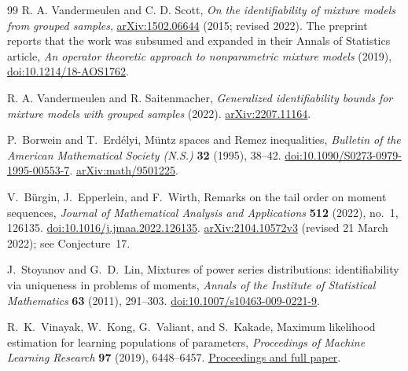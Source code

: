 \documentclass[11pt,letterpaper]{article}
\theoremstyle{definition}
\theoremstyle{remark}
\newcommand{\1}{\mathbf 1}
\begin{document}
\begin{thebibliography}{99}
R. A. Vandermeulen and C. D. Scott,
\emph{On the identifiability of mixture models from grouped samples},
\href{https://arxiv.org/abs/1502.06644}{arXiv:1502.06644}
(2015; revised 2022). The preprint reports that the work was subsumed
and expanded in their Annals of Statistics article,
\emph{An operator theoretic approach to nonparametric mixture models}
(2019), \href{https://doi.org/10.1214/18-AOS1762}{doi:10.1214/18-AOS1762}.


R. A. Vandermeulen and R. Saitenmacher,
\emph{Generalized identifiability bounds for mixture models with grouped
samples} (2022).
\href{https://arxiv.org/abs/2207.11164}{arXiv:2207.11164}.


P.~Borwein and T.~Erd\'elyi,
M\"untz spaces and Remez inequalities,
\emph{Bulletin of the American Mathematical Society (N.S.)}
\textbf{32} (1995), 38--42.
\href{https://doi.org/10.1090/S0273-0979-1995-00553-7}{doi:10.1090/S0273-0979-1995-00553-7}.
\href{https://arxiv.org/abs/math/9501225}{arXiv:math/9501225}.


V.~B\"urgin, J.~Epperlein, and F.~Wirth,
Remarks on the tail order on moment sequences,
\emph{Journal of Mathematical Analysis and Applications}
\textbf{512} (2022), no.~1, 126135.
\href{https://doi.org/10.1016/j.jmaa.2022.126135}{doi:10.1016/j.jmaa.2022.126135}.
\href{https://arxiv.org/abs/2104.10572v3}{arXiv:2104.10572v3}
(revised 21 March 2022); see Conjecture~17.


J.~Stoyanov and G.~D.~Lin,
Mixtures of power series distributions: identifiability via uniqueness
in problems of moments,
\emph{Annals of the Institute of Statistical Mathematics}
\textbf{63} (2011), 291--303.
\href{https://doi.org/10.1007/s10463-009-0221-9}{doi:10.1007/s10463-009-0221-9}.


R.~K.~Vinayak, W.~Kong, G.~Valiant, and S.~Kakade,
Maximum likelihood estimation for learning populations of parameters,
\emph{Proceedings of Machine Learning Research}
\textbf{97} (2019), 6448--6457.
\href{https://proceedings.mlr.press/v97/vinayak19a.html}{Proceedings and full paper}.

\end{thebibliography}
\end{document}
